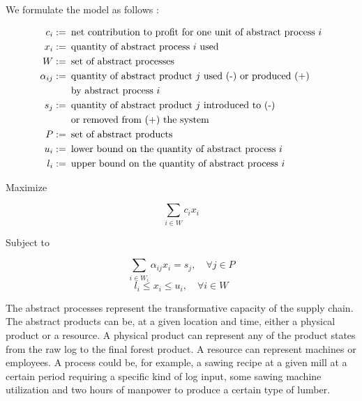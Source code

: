 We formulate the model as follows :

\medskip
\noindent
\begin{displaymath}
\begin{alignedat}{1}
c_{i}:=\, & \text{ net contribution to profit for one unit of abstract process \ensuremath{i}}\\
x_{i}:=\, & \text{ quantity of abstract process \ensuremath{i} used}\\
W:=\, & \text{ set of abstract processes}\\
\alpha_{ij}:=\, & \text{ quantity of abstract product \ensuremath{j} used (-) or produced (+)}\\
                      & \text{ by abstract process \ensuremath{i}}\\
s_{j}:=\, & \text{ quantity of abstract product \ensuremath{j} introduced to (-)}\\
             & \text{ or removed from (+) the system}\\
P:=\, & \text{ set of abstract products}\\
u_{i}:=\, & \text{ lower bound on the quantity of abstract process \ensuremath{i}}\\
l_{i}:=\, & \text{ upper bound on the quantity of abstract process \ensuremath{i}}
\end{alignedat}
\end{displaymath}

\medskip 
\noindent
Maximize

\begin{equation}
\sum_{i\in W}c_{i}x_{i}
\end{equation}

\noindent
Subject to


\begin{equation}
\sum_{i\in W_{i}}\alpha_{ij}x_{i}=s_{j},\quad\forall j\in P
\end{equation}
\begin{equation}
 l_{i}\leq x_{i}\leq u_{i},\quad\forall i\in W
\end{equation}


The abstract processes represent the transformative capacity of the
supply chain. The abstract products can be, at a given location and
time, either a physical product or a resource. A physical product
can represent any of the product states from the raw log to the final
forest product. A resource can represent machines or employees. A process
could be, for example, a sawing recipe at a given mill at a certain
period requiring a specific kind of log input, some sawing machine
utilization and two hours of manpower to produce a certain type of
lumber.

